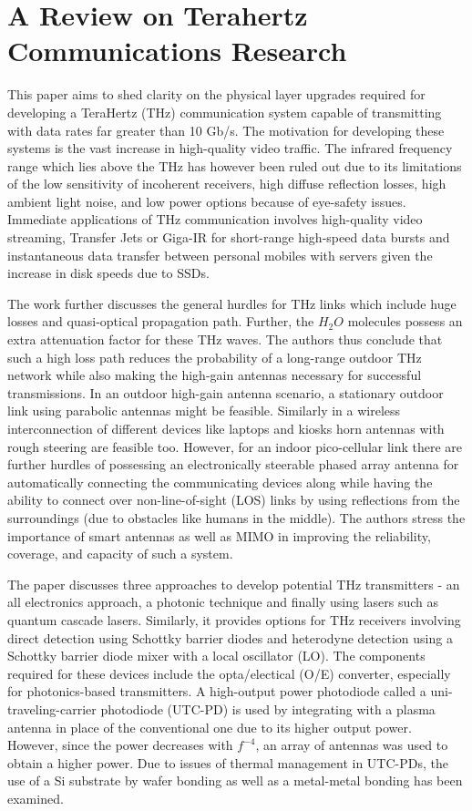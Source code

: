 \documentclass[12pt, letterpaper]{article}
\begin{document}
\section{A Review on Terahertz Communications Research}
\par
This paper aims to shed clarity on the physical layer upgrades required for developing a TeraHertz (THz) communication system capable of transmitting with data rates far greater than 10 Gb/s. The motivation for developing these systems is the vast increase in high-quality video traffic.  The infrared frequency range which lies above the THz has however been ruled out due to its limitations of the low sensitivity of incoherent receivers, high diffuse reflection losses, high ambient light noise, and low power options because of eye-safety issues. Immediate applications of THz communication involves high-quality video streaming, Transfer Jets or Giga-IR for short-range high-speed data bursts and instantaneous data transfer between personal mobiles with servers given the increase in disk speeds due to SSDs. 
\par
The work further discusses the general hurdles for THz links which include huge losses and quasi-optical propagation path. Further, the $H_2O$ molecules possess an extra attenuation factor for these THz waves. The authors thus conclude that such a high loss path reduces the probability of a long-range outdoor THz network while also making the high-gain antennas necessary for successful transmissions. In an outdoor high-gain antenna scenario, a stationary outdoor link using parabolic antennas might be feasible. Similarly in a wireless interconnection of different devices like laptops and kiosks horn antennas with rough steering are feasible too. However, for an indoor pico-cellular link there are further hurdles of possessing an electronically steerable phased array antenna for automatically connecting the communicating devices along while having the ability to connect over non-line-of-sight (LOS) links by using reflections from the surroundings (due to obstacles like humans in the middle). The authors stress the importance of smart antennas as well as MIMO in improving the reliability, coverage, and capacity of such a system.  
\par
The paper discusses three approaches to develop potential THz transmitters - an all electronics approach, a photonic technique and finally using lasers such as quantum cascade lasers. Similarly, it provides options for THz receivers involving direct detection using Schottky barrier diodes and heterodyne detection using a Schottky barrier diode mixer with a local oscillator (LO). The components required for these devices include the opta/electical (O/E) converter, especially for photonics-based transmitters. A high-output power photodiode called a uni-traveling-carrier photodiode (UTC-PD) is used by integrating with a plasma antenna in place of the conventional one due to its higher output power. However, since the power decreases with $f^{-4}$, an array of antennas was used to obtain a higher power. Due to issues of thermal management in UTC-PDs, the use of a Si substrate by wafer bonding as well as a metal-metal bonding has been examined.
\end{document}
